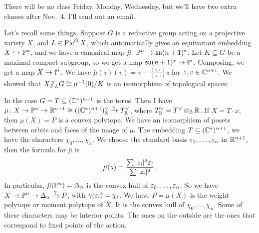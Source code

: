 
There will be no class Friday, Monday, Wednesday, but we'll have two extra classes after Nov.~4. I'll send out an email.

Let's recall some things. Suppose $G$ is a reductive group acting on a projective variety $X$, and $L\in\operatorname{Pic}^GX$, which automatically gives an equivariant embedding $X\hookrightarrow \mathbb{P}^n$, and we have a canonical map $\bar\mu\colon \mathbb{P}^n\to \mathfrak{su}(n+1)^*$. Let $K\subseteq G$ be a maximal compact subgroup, so we get a map $\mathfrak{su}(n+1)^*\to \mathfrak{k}^*$. Composing, we get a map $X\to \mathfrak{k}^*$. We have $\bar\mu(z)(v)=v-\frac{(z,v)}{(z,z)}z$ for $z,v\in \mathbb{C}^{n+1}$. We showed that $X\mbox{\rm /\!\!/}_L G\cong \mu^{-1}(0)/K$ is an isomorphism of topological spaces.

In the case $G=T\subseteq (\mathbb{C}^*)^{n+1}$ is the torus. Then I have $\mu\colon X\to \mathbb{P}^n\to \mathbb{R}^{n+1}\cong ((\mathbb{C}^*)^{n+1})^\vee_{\mathbb{R}} \xrightarrow{\gamma} T^\vee_{\mathbb{R}}$, where $T^\vee_{\mathbb{R}}=T^\vee\otimes_{\mathbb{Z}} \mathbb{R}$. If $X=\overline{T\cdot x}$, then $\mu(X)=P$ is a convex polytope. We have an isomorphism of posets between orbits and faces of the image of $\mu$. The embedding $T\subseteq (\mathbb{C}^*)^{n+1}$, we have the characters $\chi_0,\dots, \chi_n$. We choose the standard basis $\varepsilon_1,\dots, \varepsilon_n$ in $\mathbb{R}^{n+1}$, then the formula for $\bar\mu$ is
\[
 \bar\mu(z) = \frac{\sum |z_i|^2\varepsilon_i}{\sum |z_i|^2}.
\]
In particular, $\bar\mu(\mathbb{P}^n)=\Delta_n$ is the convex hull of $\varepsilon_0,\dots, \varepsilon_n$. So we have $X\to \mathbb{P}^n\to \Delta_n\xrightarrow{\gamma} P$, with $\gamma(\varepsilon_i)=\chi_i$. We have $P=\mu(X)$ is the weight polytope or moment polytope of $X$. It is the convex hull of $\chi_0,\dots, \chi_n$. Some of these characters may be interior points. The ones on the outside are the ones that correspond to fixed points of the action.


